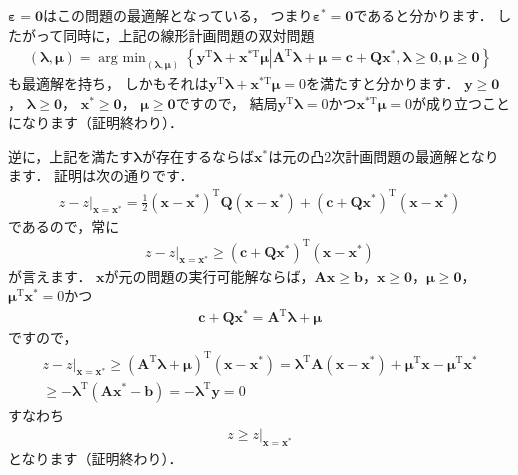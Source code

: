 \documentclass[a4paper]{jsarticle}
\begin{document}
$\boldsymbol{\varepsilon}=\boldsymbol{0}$はこの問題の最適解となっている，
つまり$\boldsymbol{\varepsilon}^{*}=\boldsymbol{0}$であると分かります．
したがって同時に，上記の線形計画問題の双対問題
\begin{align*}
(\boldsymbol{\lambda},\boldsymbol{\mu})=\mathop{\mathrm{arg~min}}_{(\boldsymbol{\lambda},\boldsymbol{\mu})}\left\{
\boldsymbol{y}^{\mathrm{T}}\boldsymbol{\lambda}+\boldsymbol{x}^{*\mathrm{T}}\boldsymbol{\mu}
\left|
\boldsymbol{A}^{\mathrm{T}}\boldsymbol{\lambda}+\boldsymbol{\mu}=\boldsymbol{c}+\boldsymbol{Q}\boldsymbol{x}^{*},
\boldsymbol{\lambda}\geq\boldsymbol{0},
\boldsymbol{\mu}\geq\boldsymbol{0}
\right.
\right\}
\end{align*}
も最適解を持ち，
しかもそれは$\boldsymbol{y}^{\mathrm{T}}\boldsymbol{\lambda}+\boldsymbol{x}^{*\mathrm{T}}\boldsymbol{\mu}=0$を満たすと分かります．
$\boldsymbol{y}\geq\boldsymbol{0}$，
$\boldsymbol{\lambda}\geq\boldsymbol{0}$，
$\boldsymbol{x}^{*}\geq\boldsymbol{0}$，
$\boldsymbol{\mu}\geq\boldsymbol{0}$ですので，
結局$\boldsymbol{y}^{\mathrm{T}}\boldsymbol{\lambda}=0$かつ$\boldsymbol{x}^{*\mathrm{T}}\boldsymbol{\mu}=0$が成り立つことになります（証明終わり）．

逆に，上記を満たす$\boldsymbol{\lambda}$が存在するならば$\boldsymbol{x}^{*}$は元の凸2次計画問題の最適解となります．
証明は次の通りです．
\begin{align*}
z-\left.z\right|_{\boldsymbol{x}=\boldsymbol{x}^{*}}
=
\frac{1}{2}(\boldsymbol{x}-\boldsymbol{x}^{*})^{\mathrm{T}}\boldsymbol{Q}(\boldsymbol{x}-\boldsymbol{x}^{*})
+(\boldsymbol{c}+\boldsymbol{Q}\boldsymbol{x}^{*})^{\mathrm{T}}(\boldsymbol{x}-\boldsymbol{x}^{*})
\end{align*}
であるので，常に
\begin{align*}
z-\left.z\right|_{\boldsymbol{x}=\boldsymbol{x}^{*}}
\geq
(\boldsymbol{c}+\boldsymbol{Q}\boldsymbol{x}^{*})^{\mathrm{T}}(\boldsymbol{x}-\boldsymbol{x}^{*})
\end{align*}
が言えます．
$\boldsymbol{x}$が元の問題の実行可能解ならば，$\boldsymbol{A}\boldsymbol{x}\geq\boldsymbol{b}$，$\boldsymbol{x}\geq\boldsymbol{0}$，$\boldsymbol{\mu}\geq\boldsymbol{0}$，$\boldsymbol{\mu}^{\mathrm{T}}\boldsymbol{x}^{*}=0$かつ
\begin{align*}
\boldsymbol{c}+\boldsymbol{Q}\boldsymbol{x}^{*}=\boldsymbol{A}^{\mathrm{T}}\boldsymbol{\lambda}+\boldsymbol{\mu}
\end{align*}
ですので，
\begin{align*}
z-\left.z\right|_{\boldsymbol{x}=\boldsymbol{x}^{*}}
\geq
(\boldsymbol{A}^{\mathrm{T}}\boldsymbol{\lambda}+\boldsymbol{\mu})^{\mathrm{T}}(\boldsymbol{x}-\boldsymbol{x}^{*})
=\boldsymbol{\lambda}^{\mathrm{T}}\boldsymbol{A}(\boldsymbol{x}-\boldsymbol{x}^{*})
+\boldsymbol{\mu}^{\mathrm{T}}\boldsymbol{x}-\boldsymbol{\mu}^{\mathrm{T}}\boldsymbol{x}^{*}
\\
\geq-\boldsymbol{\lambda}^{\mathrm{T}}(\boldsymbol{A}\boldsymbol{x}^{*}-\boldsymbol{b})=-\boldsymbol{\lambda}^{\mathrm{T}}\boldsymbol{y}=0
\end{align*}
すなわち
\begin{align*}
z\geq\left.z\right|_{\boldsymbol{x}=\boldsymbol{x}^{*}}
\end{align*}
となります（証明終わり）．
\end{document}
